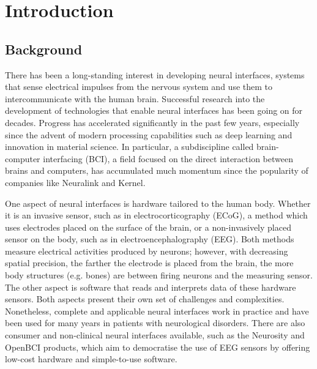 \chapter{Introduction}

\section{Background}
\label{chapter1-background}

There has been a long-standing interest in developing neural interfaces, systems that sense electrical impulses from the nervous system and use them to intercommunicate with the human brain. Successful research into the development of technologies that enable neural interfaces has been going on for decades. Progress has accelerated significantly in the past few years, especially since the advent of modern processing capabilities such as deep learning and innovation in material science. In particular, a subdiscipline called brain-computer interfacing (BCI), a field focused on the direct interaction between brains and computers, has accumulated much momentum since the popularity of companies like Neuralink and Kernel.

One aspect of neural interfaces is hardware tailored to the human body. Whether it is an invasive sensor, such as in electrocorticography (ECoG), a method which uses electrodes placed on the surface of the brain, or a non-invasively placed sensor on the body, such as in electroencephalography (EEG). Both methods measure electrical activities produced by neurons; however, with decreasing spatial precision, the farther the electrode is placed from the brain, the more body structures (e.g. bones) are between firing neurons and the measuring sensor. The other aspect is software that reads and interprets data of these hardware sensors. Both aspects present their own set of challenges and complexities. Nonetheless, complete and applicable neural interfaces work in practice and have been used for many years in patients with neurological disorders. There are also consumer and non-clinical neural interfaces available, such as the Neurosity and OpenBCI products, which aim to democratise the use of EEG sensors by offering low-cost hardware and simple-to-use software.



